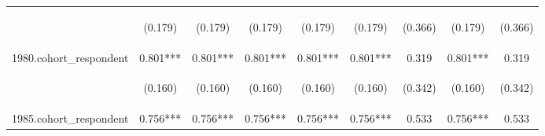 \begin{center}
\begin{tabular}{lcccccccc}
\vspace{4pt} & \begin{footnotesize}(0.179)\end{footnotesize} & \begin{footnotesize}(0.179)\end{footnotesize} & \begin{footnotesize}(0.179)\end{footnotesize} & \begin{footnotesize}(0.179)\end{footnotesize} & \begin{footnotesize}(0.179)\end{footnotesize} & \begin{footnotesize}(0.366)\end{footnotesize} & \begin{footnotesize}(0.179)\end{footnotesize} & \begin{footnotesize}(0.366)\end{footnotesize} \\
1980.cohort\_respondent & 0.801*** & 0.801*** & 0.801*** & 0.801*** & 0.801*** & 0.319 & 0.801*** & 0.319 \\
\vspace{4pt} & \begin{footnotesize}(0.160)\end{footnotesize} & \begin{footnotesize}(0.160)\end{footnotesize} & \begin{footnotesize}(0.160)\end{footnotesize} & \begin{footnotesize}(0.160)\end{footnotesize} & \begin{footnotesize}(0.160)\end{footnotesize} & \begin{footnotesize}(0.342)\end{footnotesize} & \begin{footnotesize}(0.160)\end{footnotesize} & \begin{footnotesize}(0.342)\end{footnotesize} \\
1985.cohort\_respondent & 0.756*** & 0.756*** & 0.756*** & 0.756*** & 0.756*** & 0.533 & 0.756*** & 0.533 \\

\end{tabular}
\end{center}

